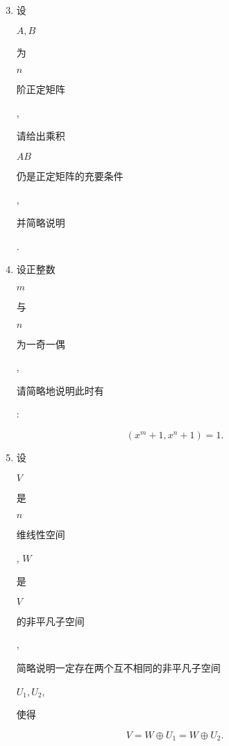 \documentclass[10pt]{article}
\begin{document}
\begin{enumerate}
  \setcounter{enumi}{2}
  \item \begin{CJK}{UTF8}{mj}设\end{CJK} $A, B$ \begin{CJK}{UTF8}{mj}为\end{CJK} $n$ \begin{CJK}{UTF8}{mj}阶正定矩阵\end{CJK}, \begin{CJK}{UTF8}{mj}请给出乘积\end{CJK} $A B$ \begin{CJK}{UTF8}{mj}仍是正定矩阵的充要条件\end{CJK}, \begin{CJK}{UTF8}{mj}并简略说明\end{CJK}.

  \item \begin{CJK}{UTF8}{mj}设正整数\end{CJK} $m$ \begin{CJK}{UTF8}{mj}与\end{CJK} $n$ \begin{CJK}{UTF8}{mj}为一奇一偶\end{CJK}, \begin{CJK}{UTF8}{mj}请简略地说明此时有\end{CJK}:

\end{enumerate}
$$
\left(x^{m}+1, x^{n}+1\right)=1 .
$$

\begin{enumerate}
  \setcounter{enumi}{4}
  \item \begin{CJK}{UTF8}{mj}设\end{CJK} $V$ \begin{CJK}{UTF8}{mj}是\end{CJK} $n$ \begin{CJK}{UTF8}{mj}维线性空间\end{CJK}, $W$ \begin{CJK}{UTF8}{mj}是\end{CJK} $V$ \begin{CJK}{UTF8}{mj}的非平凡子空间\end{CJK}, \begin{CJK}{UTF8}{mj}简略说明一定存在两个互不相同的非平凡子空间\end{CJK} $U_{1}, U_{2}$, \begin{CJK}{UTF8}{mj}使得\end{CJK}
\end{enumerate}
$$
V=W \oplus U_{1}=W \oplus U_{2} .
$$
\end{document}
